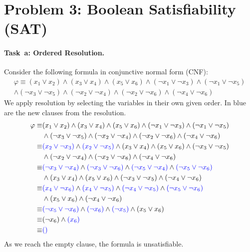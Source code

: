 \section*{Problem 3: Boolean Satisfiability (SAT)}

\newcommand{\MiniSat}{Mini\-Sat}  %
\newcommand{\SolverSAT}{\todo{\MiniSat}\xspace}  %
\newcommand{\TimeoutSAT}{\todo{60.0}}  %

\paragraph{Task~a: Ordered Resolution.}
Consider the following formula in conjunctive normal form (CNF):
\begin{multline*}
  \varphi \equiv (x_1 \lor x_2) \land
  (x_3 \lor x_4) \land
  (x_5 \lor x_6) \land
  (\neg x_1 \lor \neg x_3) \land
  (\neg x_1 \lor \neg x_5) \\ \land
  (\neg x_3 \lor \neg x_5) \land
  (\neg x_2 \lor \neg x_4) \land
  (\neg x_2 \lor \neg x_6) \land
  (\neg x_4 \lor \neg x_6)
\end{multline*}
We apply resolution by selecting the variables in their own given order. In blue are the new clauses from the resolution.
\begin{align*}
\varphi \equiv & (x_1 \lor x_2) \land
  	(x_3 \lor x_4) \land
  	(x_5 \lor x_6) \land
  	(\neg x_1 \lor \neg x_3) \land
  	(\neg x_1 \lor \neg x_5) \\ & \land
  	(\neg x_3 \lor \neg x_5) \land
  	(\neg x_2 \lor \neg x_4) \land
  	(\neg x_2 \lor \neg x_6) \land
  	(\neg x_4 \lor \neg x_6) \\
  \equiv & {\color{blue}(x_2 \lor \neg x_3)} \land
  	{\color{blue}(x_2 \lor \neg x_5)} \land
  	(x_3 \lor x_4) \land
	(x_5 \lor x_6) \land
	(\neg x_3 \lor \neg x_5) \\ & \land
	(\neg x_2 \lor \neg x_4) \land
  	(\neg x_2 \lor \neg x_6) \land
  	(\neg x_4 \lor \neg x_6) \\
  \equiv & {\color{blue}(\neg x_3 \lor \neg x_4)} \land
  	{\color{blue}(\neg x_3 \lor \neg x_6)} \land
	{\color{blue}(\neg x_5 \lor \neg x_4)} \land
	{\color{blue}(\neg x_5 \lor \neg x_6)} \\ & \land
	(x_3 \lor x_4) \land
	(x_5 \lor x_6) \land
	(\neg x_3 \lor \neg x_5) \land
  	(\neg x_4 \lor \neg x_6) \\
  \equiv & {\color{blue}(x_4 \lor \neg x_6)} \land
  	{\color{blue}(x_4 \lor \neg x_5)} \land
    {\color{blue}(\neg x_4 \lor \neg x_5)} \land
  	{\color{blue}(\neg x_5 \lor \neg x_6)} \\ & \land
  	(x_5 \lor x_6) \land
    (\neg x_4 \lor \neg x_6) \\
  \equiv & {\color{blue}(\neg x_5 \lor \neg x_6)} \land
    {\color{blue}(\neg x_6)} \land
    {\color{blue}(\neg x_5)} \land
    (x_5 \lor x_6) \\
    \equiv & (\neg x_6) \land {\color{blue}(x_6)} \\
    \equiv & {\color{blue}()}
\end{align*}
As we reach the empty clause, the formula is unsatisfiable. 

